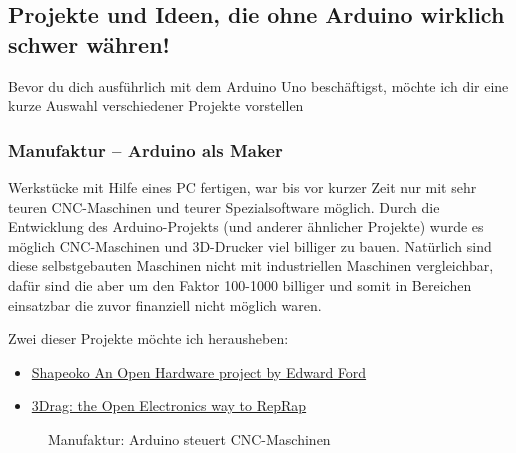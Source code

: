 \subsection{Projekte und Ideen, die ohne Arduino wirklich schwer währen!}

Bevor du dich ausführlich mit dem Arduino Uno beschäftigst, möchte ich dir eine kurze Auswahl verschiedener Projekte vorstellen

\subsubsection{Manufaktur -- Arduino als Maker }

Werkstücke mit Hilfe eines PC fertigen, war bis vor kurzer Zeit nur mit sehr teuren CNC-Maschinen und teurer Spezialsoftware möglich.
Durch die Entwicklung des Arduino-Projekts (und anderer ähnlicher Projekte) wurde es möglich CNC-Maschinen und 3D-Drucker viel billiger zu bauen. Natürlich sind diese selbstgebauten Maschinen nicht mit industriellen Maschinen vergleichbar, dafür sind die aber um den Faktor 100-1000 billiger und somit in Bereichen einsatzbar die zuvor finanziell nicht möglich waren.
   
Zwei dieser Projekte möchte ich herausheben:
\begin{itemize}
  \item \href{http://www.shapeoko.com/}{Shapeoko An Open Hardware project by Edward Ford}
  \item \href{http://www.open-electronics.org/3drag-the-open-electronics-way-to-reprap/}{3Drag: the Open Electronics way to RepRap}
\end{itemize}
\begin{figure}[h]
  \begin{center}
    \label{fig:Manufaktur}
    \caption{Manufaktur: Arduino steuert CNC-Maschinen}
  \end{center}
\end{figure}


